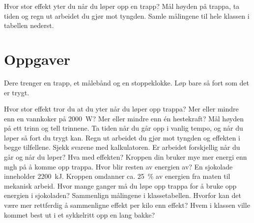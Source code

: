 \documentclass[11pt]{article}
\begin{document}

Hvor stor effekt yter du når du løper opp en trapp? Mål høyden på trappa, ta tiden og regn ut arbeidet du gjør mot tyngden. Samle målingene til hele klassen i tabellen nederst.

\section*{Oppgaver}

Dere trenger en trapp, et målebånd og en stoppeklokke. Løp bare så fort som det er trygt.

\begin{oppgaveliste}
\oppgave {}Hvor stor effekt tror du at du yter når du løper opp trappa? Mer eller mindre enn en vannkoker på 2000~W? Mer eller mindre enn én hestekraft?
\svar
\oppgave {}Mål høyden på ett trinn og tell trinnene. Ta tiden når du går opp i vanlig tempo, og når du løper så fort du trygt kan.
\svar
\oppgave {}Regn ut arbeidet du gjør mot tyngden og effekten i begge tilfellene. Sjekk svarene med kalkulatoren. Er arbeidet forskjellig når du går og når du løper? Hva med effekten?
\svar
\oppgave {}Kroppen din bruker mye mer energi enn mgh på å komme opp trappa. Hvor blir resten av energien av?
\svar
\oppgave {}En sjokolade inneholder 2200~kJ. Kroppen omdanner ca. 25~\% av energien fra maten til mekanisk arbeid. Hvor mange ganger må du løpe opp trappa for å bruke opp energien i sjokoladen?
\svar
\oppgave {}Sammenlign målingene i klassetabellen. Hvorfor kan det være mer rettferdig å sammenligne effekt per kilo enn effekt? Hvem i klassen ville kommet best ut i et sykkelritt opp en lang bakke?
\svar
\end{oppgaveliste}
\end{document}
